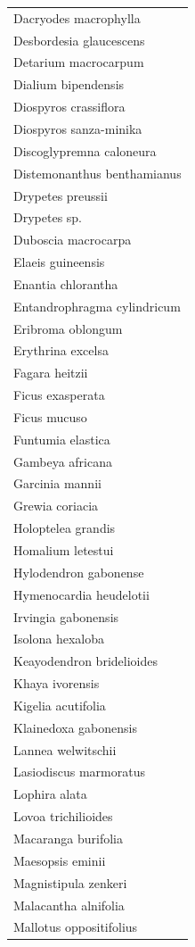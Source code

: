 \documentclass[
  12pt,
  a4paper,
  extrafontsizes,
  onecolumn,
  openright]{book}
\theoremstyle{definition}
\theoremstyle{definition}
\theoremstyle{definition}
\theoremstyle{definition}
\theoremstyle{remark}
\begin{document}
\begin{longtable}[]{@{}l@{}}
Dacryodes macrophylla \\
Desbordesia glaucescens \\
Detarium macrocarpum \\
Dialium bipendensis \\
Diospyros crassiflora \\
Diospyros sanza-minika \\
Discoglypremna caloneura \\
Distemonanthus benthamianus \\
Drypetes preussii \\
Drypetes sp. \\
Duboscia macrocarpa \\
Elaeis guineensis \\
Enantia chlorantha \\
Entandrophragma cylindricum \\
Eribroma oblongum \\
Erythrina excelsa \\
Fagara heitzii \\
Ficus exasperata \\
Ficus mucuso \\
Funtumia elastica \\
Gambeya africana \\
Garcinia mannii \\
Grewia coriacia \\
Holoptelea grandis \\
Homalium letestui \\
Hylodendron gabonense \\
Hymenocardia heudelotii \\
Irvingia gabonensis \\
Isolona hexaloba \\
Keayodendron bridelioides \\
Khaya ivorensis \\
Kigelia acutifolia \\
Klainedoxa gabonensis \\
Lannea welwitschii \\
Lasiodiscus marmoratus \\
Lophira alata \\
Lovoa trichilioides \\
Macaranga burifolia \\
Maesopsis eminii \\
Magnistipula zenkeri \\
Malacantha alnifolia \\
Mallotus oppositifolius \\

\end{longtable}
\end{document}
